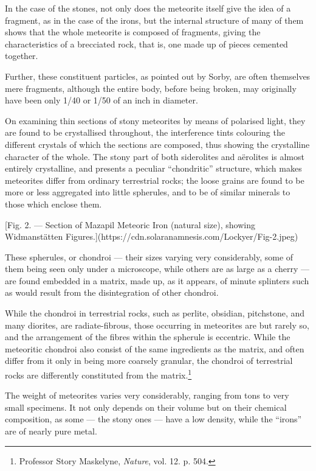 \documentclass[a4paper, 12pt, oneside, polutonikogreek, english]{article}
\begin{document}
In the case of the stones, not only does the meteorite itself give the idea of a fragment, as in the case of the irons, but the internal structure of many of them shows that the whole meteorite is composed of fragments, giving the characteristics of a brecciated rock, that is, one made up of pieces cemented together.

Further, these constituent particles, as pointed out by Sorby, are often themselves mere fragments, although the entire body, before being broken, may originally have been only 1/40 or 1/50 of an inch in diameter.

On examining thin sections of stony meteorites by means of polarised light, they are found to be crystallised throughout, the interference tints colouring the different crystals of which the sections are composed, thus showing the crystalline character of the whole. The stony part of both siderolites and aërolites is almost entirely crystalline, and presents a peculiar ``chondritic'' structure, which makes meteorites differ from ordinary terrestrial rocks; the loose grains are found to be more or less aggregated into little spherules, and to be of similar minerals to those which enclose them.

[Fig. 2. --- Section of Mazapil Meteoric Iron (natural size), showing Widmanstätten Figures.](https://cdn.solaranamnesis.com/Lockyer/Fig-2.jpeg)

These spherules, or chondroi --- their sizes varying very considerably, some of them being seen only under a microscope, while others are as large as a cherry --- are found embedded in a matrix, made up, as it appears, of minute splinters such as would result from the disintegration of other chondroi.

While the chondroi in terrestrial rocks, such as perlite, obsidian, pitchstone, and many diorites, are radiate-fibrous, those occurring in meteorites are but rarely so, and the arrangement of the fibres within the spherule is eccentric. While the meteoritic chondroi also consist of the same ingredients as the matrix, and often differ from it only in being more coarsely granular, the chondroi of terrestrial rocks are differently constituted from the matrix.\footnote{Professor Story Maskelyne, \emph{Nature}, vol. 12. p. 504.}

The weight of meteorites varies very considerably, ranging from tons to very small specimens. It not only depends on their volume but on their chemical composition, as some --- the stony ones --- have a low density, while the ``irons'' are of nearly pure metal.
\end{document}
